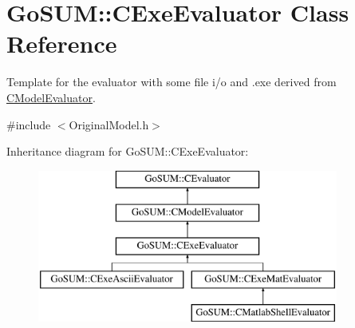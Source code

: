 \hypertarget{class_go_s_u_m_1_1_c_exe_evaluator}{\section{Go\-S\-U\-M\-:\-:C\-Exe\-Evaluator Class Reference}
\label{class_go_s_u_m_1_1_c_exe_evaluator}
}


Template for the evaluator with some file i/o and .exe derived from \hyperlink{class_go_s_u_m_1_1_c_model_evaluator}{C\-Model\-Evaluator}.  




{\ttfamily \#include $<$Original\-Model.\-h$>$}

Inheritance diagram for Go\-S\-U\-M\-:\-:C\-Exe\-Evaluator\-:\begin{figure}[H]
\begin{center}
\leavevmode
\includegraphics[height=5.000000cm]{class_go_s_u_m_1_1_c_exe_evaluator}
\end{center}
\end{figure}
